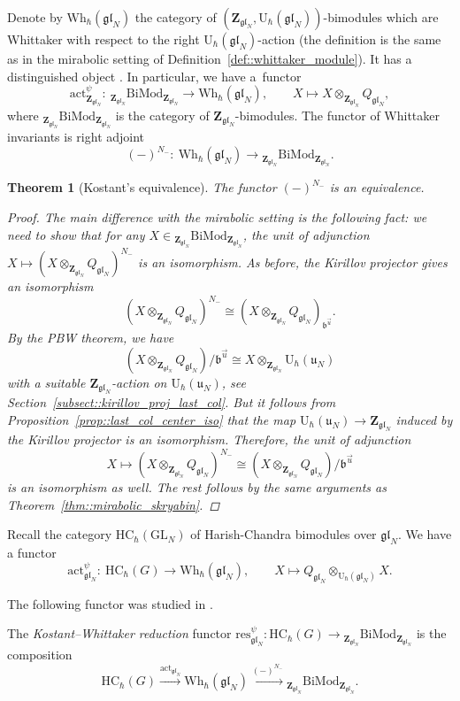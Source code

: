 \documentclass[10pt,a4paper]{amsart}
\numberwithin{equation}{section}
\newtheorem{Theorem}{Theorem}[section]
\newcommand{\U}{\mathrm{U}_{\hbar}}
\newcommand{\Z}{\mathbf{Z}}
\newcommand{\GL}{\mathrm{GL}}
\renewcommand{\b}{\mathfrak{b}}
\newcommand{\n}{\mathfrak{n}}
\renewcommand{\u}{\mathfrak{u}}
\newcommand{\Wh}{\mathrm{Wh}_{\hbar}}
\newcommand{\act}{\mathrm{act}}
\newcommand{\BiMod}[2]{{}_{#1}\mathrm{BiMod}_{#2}}
\newcommand{\HC}{\mathrm{HC}_{\hbar}}
\newcommand{\res}{\mathrm{res}}
\newcommand{\gl}{\mathfrak{gl}}
\begin{document}
	Denote by $\Wh(\gl_N)$ the category of $(\Z_{\gl_N},\U(\gl_N))$-bimodules which are Whittaker with respect to the right $\U(\gl_N)$-action (the definition is the same as in the mirabolic setting of Definition~\ref{def::whittaker_module}). It has a distinguished object \smash{$Q_{\gl_N} = \n_-^{\psi} \backslash \U(\gl_N)$}. In particular, we have a~functor
	\[
	\act_{\Z_{\gl_N}}^{\psi} \colon\ \BiMod{\Z_{\gl_N}}{\Z_{\gl_N}}\rightarrow \Wh(\gl_N), \qquad X \mapsto X \otimes_{\Z_{\gl_N}} Q_{\gl_N},
	\]
	where $\BiMod{\Z_{\gl_N}}{\Z_{\gl_N}}$ is the category of $\Z_{\gl_N}$-bimodules. The functor of Whittaker invariants is right adjoint
	\[
	(-)^{N_-} \colon\ \Wh(\gl_N) \rightarrow \BiMod{\Z_{\gl_N}}{\Z_{\gl_N}}.
	\]
	
	\begin{Theorem}[Kostant's equivalence]
		\label{thm::gl_skryabin}
		The functor $(-)^{N_-}$ is an equivalence.
		\begin{proof}
			The main difference with the mirabolic setting is the following fact: we need to show that for any $X \in \BiMod{\Z_{\gl_N}}{\Z_{\gl_N}}$, the unit of adjunction
$
			X \mapsto (X \otimes_{\Z_{\gl_N}} Q_{\gl_N})^{N_-}
$
			is an isomorphism. As before, the Kirillov projector gives an isomorphism
			\[
			(X \otimes_{\Z_{\gl_N}} Q_{\gl_N})^{N_-} \cong (X \otimes_{\Z_{\gl_N}} Q_{\gl_N})_{\b^{\vec{u}}}.
			\]
			By the PBW theorem, we have
			\[
			(X \otimes_{\Z_{\gl_N}} Q_{\gl_N})/\b^{\vec{u}} \cong X \otimes_{\Z_{\gl_N}} \U(\u_N)
			\]
			with a suitable $\Z_{\gl_N}$-action on $\U(\u_N)$, see Section~\ref{subsect::kirillov_proj_last_col}. But it follows from Proposition~\ref{prop::last_col_center_iso} that the map $\U(\u_N) \rightarrow \Z_{\gl_N}$ induced by the Kirillov projector is an isomorphism. Therefore, the unit of adjunction
			\[
			X \mapsto (X \otimes_{\Z_{\gl_N}} Q_{\gl_N})^{N_-} \cong (X \otimes_{\Z_{\gl_N}} Q_{\gl_N})/\b^{\vec{u}}
			\]
			is an isomorphism as well. The rest follows by the same arguments as Theorem~\ref{thm::mirabolic_skryabin}.
		\end{proof}
	\end{Theorem}
	
	Recall the category $\HC(\GL_N)$ of Harish-Chandra bimodules over $\gl_N$. We have a functor
	\[
	\act_{\gl_N}^{\psi}\colon\ \HC(G) \rightarrow \Wh(\gl_N), \qquad X \mapsto Q_{\gl_N} \otimes_{\U(\gl_N)} X.
	\]
	
	The following functor was studied in \cite{BezrukavnikovFinkelberg}.
	\begin{Definition}
		The \emph{Kostant--Whittaker reduction} functor $\res_{\gl_N}^{\psi} \colon \HC(G) \rightarrow \BiMod{\Z_{\gl_N}}{\Z_{\gl_N}}$ is the composition
		\[
		\HC(G) \xrightarrow{\act_{\gl_N}} \Wh(\gl_N) \xrightarrow{(-)^{N_-}} \BiMod{\Z_{\gl_N}}{\Z_{\gl_N}}.
		\]
	\end{Definition}
	
\end{document}

